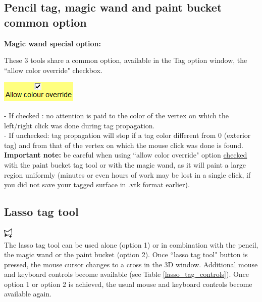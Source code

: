 \subsection{Pencil tag, magic wand and paint bucket common option}
\noindent
\textbf{Magic wand special option:}\\
\noindent
\begin{minipage}{0.6\textwidth}
These 3 tools share a common option, available in the Tag option
window, the ``allow color override" checkbox.\end{minipage}    
\begin{minipage}{0.4\textwidth}\centering
  \includegraphics[scale=0.5]{images/Tags/Allow_color_override.png}
 \end{minipage} 
\noindent
- If checked : no attention is paid to the color of the vertex on
which the left/right click was done during tag propagation.\\
- If unchecked: tag propagation will stop if a tag color different from 0 (exterior tag) and from that of the vertex on which the mouse click was done is found.\\
\textbf{Important note:} be careful when using ``allow color override" option \underline{checked} with the paint bucket tag tool or with the magic wand, as it will paint a large region uniformly (minutes or even hours of work may be lost in a single click, if you did not save your tagged surface in .vtk format earlier).

\subsection{Lasso tag tool} \label{lasso_tag_section}
\includegraphics[scale=0.7]{images/pixmap/Lasso_plus.png}\\
The lasso tag tool can be used alone (option 1) or in combination with the pencil, the magic wand or the paint bucket (option 2). Once ``lasso tag tool" button is pressed, the mouse cursor changes to a cross in the 3D window. Additional mouse and keyboard controls become available (see Table \ref{lasso_tag_controls}). Once option 1 or option 2 is achieved, the usual mouse and keyboard controls become available
again.

